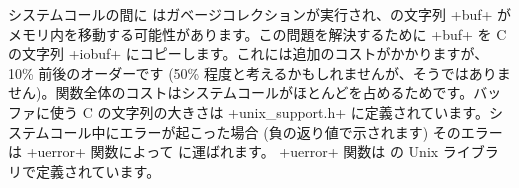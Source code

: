 システムコールの間に \ocaml はガベージコレクションが実行され、\ocaml の文字列 \ml+buf+ がメモリ内を移動する可能性があります。この問題を解決するために \ml+buf+ を C の文字列 \ml+iobuf+ にコピーします。これには追加のコストがかかりますが、10\% 前後のオーダーです (50\% 程度と考えるかもしれませんが、そうではありません)。関数全体のコストはシステムコールがほとんどを占めるためです。バッファに使う C の文字列の大きさは \ml+unix_support.h+ に定義されています。システムコール中にエラーが起こった場合 (負の返り値で示されます) そのエラーは \ml+uerror+ 関数によって \ocaml に運ばれます。 \ml+uerror+ 関数は \ocaml の Unix ライブラリで定義されています。

